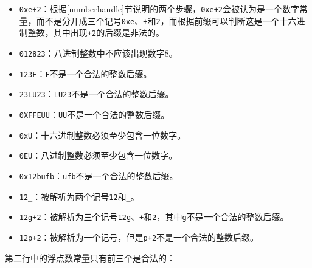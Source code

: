 \documentclass[lang=cn,11pt,a4paper,cite=authornum]{paper}
\begin{document}
\begin{itemize}
    \item \texttt{0xe+2}：根据\ref{numberhandle}节说明的两个步骤，\texttt{0xe+2}会被认为是一个数字常量，而不是分开成三个记号\texttt{0xe}、\texttt{+}和\texttt{2}，而根据前缀可以判断这是一个十六进制整数，其中出现\texttt{+2}的后缀是非法的。
    \item \texttt{012823}：八进制整数中不应该出现数字8。
    \item \texttt{123F}：\texttt{F}不是一个合法的整数后缀。
    \item \texttt{23LU23}：\texttt{LU23}不是一个合法的整数后缀。
    \item \texttt{0XFFEUU}：\texttt{UU}不是一个合法的整数后缀。
    \item \texttt{0xU}：十六进制整数必须至少包含一位数字。
    \item \texttt{0EU}：八进制整数必须至少包含一位数字。
    \item \texttt{0x12bufb}：\texttt{ufb}不是一个合法的整数后缀。
    \item \texttt{12_}：被解析为两个记号\texttt{12}和\texttt{_}。
    \item \texttt{12g+2}：被解析为三个记号\texttt{12g}、\texttt{+}和\texttt{2}，其中\texttt{g}不是一个合法的整数后缀。
    \item \texttt{12p+2}：被解析为一个记号，但是\texttt{p+2}不是一个合法的整数后缀。
\end{itemize}

第二行中的浮点数常量只有前三个是合法的：
\end{document}
